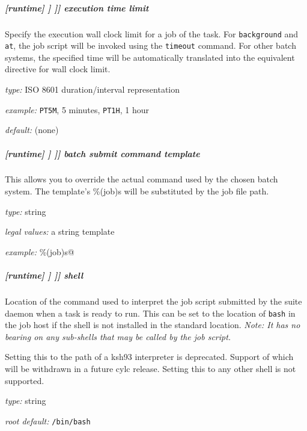 \subparagraph[execution time limit]{[runtime] \textrightarrow [[\_\_NAME\_\_]] \textrightarrow [[[job]]] \textrightarrow execution time limit}

Specify the execution wall clock limit for a job of the task.
For \lstinline=background= and \lstinline=at=, the job script will be invoked using the \lstinline=timeout= command.
For other batch systems, the specified time will be automatically translated into the equivalent directive for wall clock limit.

\begin{myitemize}
    \item {\em type:} ISO 8601 duration/interval representation
    \item {\em example:} \lstinline=PT5M=, 5 minutes, \lstinline=PT1H=, 1 hour
    \item {\em default:} (none)
\end{myitemize}

\subparagraph[batch submit command template]{[runtime] \textrightarrow [[\_\_NAME\_\_]] \textrightarrow [[[job]]] \textrightarrow batch submit command template}

This allows you to override the actual command used by the chosen batch
system. The template's \%(job)s will be substituted by the
job file path.

\begin{myitemize}
\item {\em type:} string
\item {\em legal values:} a string template
\item {\em example:} \lstinline@llsubmit \%(job)s@
\end{myitemize}

\subparagraph[shell]{[runtime] \textrightarrow [[\_\_NAME\_\_]] \textrightarrow [[[job]]] \textrightarrow shell}
\label{JobSubShell}

Location of the command used to interpret the job script submitted by the
suite daemon when a task is ready to run. This can be set to the location of
\lstinline=bash= in the job host if the shell is not installed in the standard
location.
{\em Note: It has no bearing on any sub-shells that may be called by the job script.}

Setting this to the path of a ksh93 interpreter is deprecated. Support of which
will be withdrawn in a future cylc release. Setting this to any other shell is
not supported.

\begin{myitemize}
\item {\em type:} string
\item {\em root default:} \lstinline=/bin/bash=
\end{myitemize}


